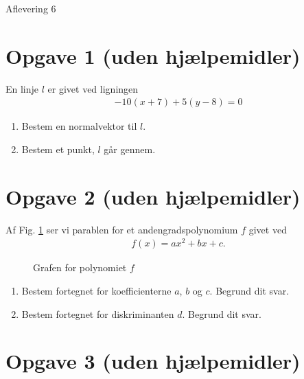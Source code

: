 \begin{center}
\Huge
Aflevering 6
\end{center}

\section*{Opgave 1 (uden hjælpemidler)}

En linje $l$ er givet ved ligningen 
\begin{align*}
-10(x+7) + 5(y-8) = 0
\end{align*}
\begin{enumerate}[label=\roman*)]
\item Bestem en normalvektor til $l$.
\item Bestem et punkt, $l$ går gennem. 
\end{enumerate}


\section*{Opgave 2 (uden hjælpemidler)}

Af Fig. \ref{fig:poly} ser vi parablen for et andengradspolynomium $f$ givet ved
\begin{align*}
f(x)=ax^2+bx+c. 
\end{align*}

\begin{figure}[H]
\centering
{}
\caption{Grafen for polynomiet $f$}
\label{fig:poly}
\end{figure}

\begin{enumerate}[label=\roman*)]
\item Bestem fortegnet for koefficienterne $a$, $b$ og $c$. Begrund dit svar.
\item Bestem fortegnet for diskriminanten $d$. Begrund dit svar.
\end{enumerate}

\section*{Opgave 3 (uden hjælpemidler)}

